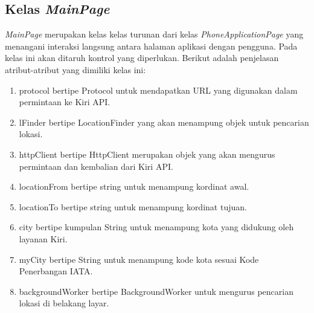 \subsection{Kelas \textit{MainPage}}
\label{lab:Kelas MainPage}
\hspace{0.5cm} \textit{MainPage} merupakan kelas kelas turunan dari kelas \textit{PhoneApplicationPage} yang menangani interaksi langsung antara halaman aplikasi dengan pengguna. Pada kelas ini akan ditaruh kontrol yang diperlukan. Berikut adalah penjelasan atribut-atribut yang dimiliki kelas ini:
\begin{enumerate}
	\item protocol bertipe Protocol untuk mendapatkan URL yang digunakan dalam permintaan ke Kiri API.
	\item lFinder bertipe LocationFinder yang akan menampung objek untuk pencarian lokasi.
	\item httpClient bertipe HttpClient merupakan objek yang akan mengurus permintaan dan kembalian dari Kiri API.
	\item locationFrom bertipe string untuk menampung kordinat awal.
	\item locationTo bertipe string untuk menampung kordinat tujuan.
	\item city bertipe kumpulan String untuk menampung kota yang didukung oleh layanan Kiri.
	\item myCity bertipe String untuk menampung kode kota sesuai Kode Penerbangan IATA.
	\item backgroundWorker bertipe BackgroundWorker untuk mengurus pencarian lokasi di belakang layar.
\end{enumerate}


